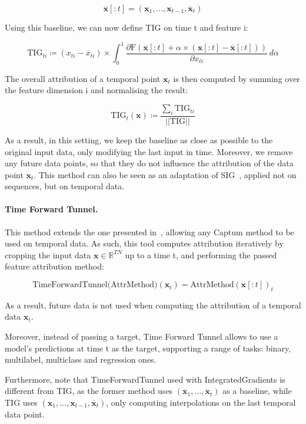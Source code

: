 \[ \overline{\textbf{x}}[:t] = (\textbf{x}_1, \dots, \textbf{x}_{t-1}, \overline{\textbf{x}}_t) \]

Using this baseline, we can now define TIG on time t and feature i:

\begin{equation}
    \textrm{TIG}_{ti} \coloneqq  (x_{ti} - \overline{x}_{ti}) \times
    \int_0^1 \frac{\partial \textrm{F}(\overline{\textbf{x}}[:t] + \alpha \times (\textbf{x}[:t] -
    \overline{\textbf{x}}[:t]))}{\partial x_{ti}} \, d\alpha
    \label{eq:tig}
\end{equation}

The overall attribution of a temporal point $\textbf{x}_t$ is then computed by summing over the feature dimension i and
normalising the result:

\[ \textrm{TIG}_t(\textbf{x}) \coloneqq \frac{\sum_i \textrm{TIG}_{ti}}{||\textrm{TIG}||} \]

As a result, in this setting, we keep the baseline as close as possible to the original input data, only modifying the
last input in time.
Moreover, we remove any future data points, so that they do not influence the attribution of the data point $\textbf{x}_t$.
This method can also be seen as an adaptation of SIG~\citep{enguehard2023sequential}, applied not on sequences, but on
temporal data.


\paragraph{Time Forward Tunnel.}

This method extends the one presented in~\citep{tonekaboni2020went}, allowing any Captum method to be used on temporal
data.
As such, this tool computes attribution iteratively by cropping the input data $\textbf{x} \in \mathbb{R}^{TN}$ up to
a time t, and performing the passed feature attribution method:

\[ \textrm{TimeForwardTunnel(AttrMethod)}(\textbf{x}_t) = \textrm{AttrMethod}(\textbf{x}[:t])_t \]

As a result, future data is not used when computing the attribution of a temporal data $\textbf{x}_t$.

Moreover, instead of passing a target, Time Forward Tunnel allows to use a model's predictions at time t as the target,
supporting a range of tasks: binary, multilabel, multiclass and regression ones.

Furthermore, note that TimeForwardTunnel used with IntegratedGradients is different from TIG, as the former method uses
$(\overline{\textbf{x}}_1, \dots, \overline{\textbf{x}}_t)$ as a baseline, while TIG uses
$(\textbf{x}_1, \dots, \textbf{x}_{t-1}, \overline{\textbf{x}}_t)$,
only computing interpolations on the last temporal data point.


